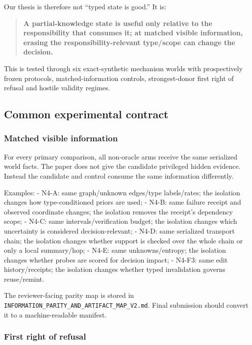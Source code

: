 \documentclass[10pt]{article}
\begin{document}
Our thesis is therefore not ``typed state is good.'' It is:

\begin{quote}
\textbf{A partial-knowledge state is useful only relative to the
responsibility that consumes it; at matched visible information, erasing
the responsibility-relevant type/scope can change the decision.}
\end{quote}

This is tested through six exact-synthetic mechanism worlds with
prospectively frozen protocols, matched-information controls,
strongest-donor first right of refusal and hostile validity regimes.

\hypertarget{common-experimental-contract}{%
\subsection{Common experimental
contract}\label{common-experimental-contract}}

\hypertarget{matched-visible-information}{%
\subsubsection{Matched visible
information}\label{matched-visible-information}}

For every primary comparison, all non-oracle arms receive the same
serialized world facts. The paper does not give the candidate privileged
hidden evidence. Instead the candidate and control consume the same
information differently.

Examples: - N4-A: same graph/unknown edges/type labels/rates; the
isolation changes how type-conditioned priors are used; - N4-B: same
failure receipt and observed coordinate changes; the isolation removes
the receipt's dependency scope; - N4-C: same intervals/verification
budget; the isolation changes which uncertainty is considered
decision-relevant; - N4-D: same serialized transport chain; the
isolation changes whether support is checked over the whole chain or
only a local summary/hop; - N4-E: same unknowns/entropy; the isolation
changes whether probes are scored for decision impact; - N4-F3: same
edit history/receipts; the isolation changes whether typed invalidation
governs reuse/remint.

The reviewer-facing parity map is stored in
\texttt{INFORMATION\_PARITY\_AND\_ARTIFACT\_MAP\_V2.md}. Final
submission should convert it to a machine-readable manifest.

\hypertarget{first-right-of-refusal}{%
\subsubsection{First right of refusal}\label{first-right-of-refusal}}
\end{document}
